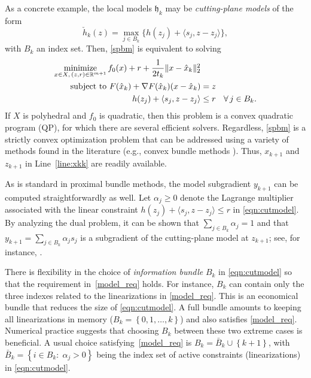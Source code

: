 \documentclass[smallextended,envcountsect]{svjour3}
\newcommand{\norm}[1]{\textstyle{\Vert} #1 \textstyle{\Vert}_2}
\newcommand{\col}[1]{\left\{#1\right\}}
\newcommand{\inner}[2]{\langle#1,#2\rangle}
\renewcommand{\Re}{\mathbb{R}}
\newcommand{\modelh}{\mathfrak{h}}
\newcommand{\nnmin}{\mathop{\rm minimize}}
\begin{document}
As a concrete example, the local models $\modelh_k$ may be {\em cutting-plane models} of the form
\begin{equation}\label{cp}
\check{h}_k(z)=\max_{j\in B_k}\big\{h(z_j)+\inner{s_j}{z-z_j}\big\},
\end{equation}
with $B_k$ an index set. Then, \eqref{spbm} is equivalent to solving 
\begin{align}
\nnmin_{x\in X,\, (z,r) \in \Re^{m+1}} f_0(x) + r + \frac{1}{2t_k}\norm{x-\hat x_k}^2&\label{eqn:cutmodel}\\
\mbox{subject to } F(\hat x_k)+\nabla F(\hat x_k)(x-\hat x_k) & = z\nonumber\\
h(z_j) + \inner{s_j}{z-z_j} & \leq r~~\; \forall\, j\in B_k.\nonumber
\end{align}
If $X$ is polyhedral and $f_0$ is quadratic, then this problem is a convex quadratic program (QP), for which there are several efficient solvers. Regardless, \eqref{spbm} is a strictly convex optimization problem that can be addressed using a variety of methods found in the literature (e.g., convex bundle methods \cite[Chapters 11 \& 12]{WWBook}). Thus, $x_{k+1}$ and $z_{k+1}$ in Line~\ref{line:xkk} are readily available. 

As is standard in proximal bundle methods, the model subgradient $y_{k+1}$ can be computed straightforwardly as well. Let $\alpha_j \geq 0$ denote the Lagrange multiplier associated with the linear constraint $h(z_j) + \inner{s_j}{z - z_j} \leq r$ in \eqref{eqn:cutmodel}. By analyzing the dual problem, it can be shown that $\sum_{j \in B_k} \alpha_j = 1$ and that
$
y_{k+1} = \sum_{j \in B_k} \alpha_j s_j
$
is a subgradient of the cutting-plane model at $z_{k+1}$; see, for instance, \cite[\S\,11.5]{WWBook}.  

There is flexibility in the choice of \emph{information bundle} $B_k$ in \eqref{eqn:cutmodel} so that the requirement in~\eqref{model_req} holds. For instance, $B_k$ can contain only the three indexes related to the linearizations in \eqref{model_req}. This is an economical bundle that reduces the size of \eqref{eqn:cutmodel}. A full bundle amounts to keeping all linearizations in memory ($B_k=\col{0,1,\ldots,k}$) and also satisfies \eqref{model_req}. Numerical practice suggests that choosing $B_k$ between these two extreme cases is beneficial. A usual choice satisfying~\eqref{model_req} is $B_k=\bar B_k \cup\col{k+1}$, with $\bar B_k=\col{i \in B_k: \; \alpha_j >0 }$ being the index set of active constraints (linearizations) in \eqref{eqn:cutmodel}.
\end{document}
